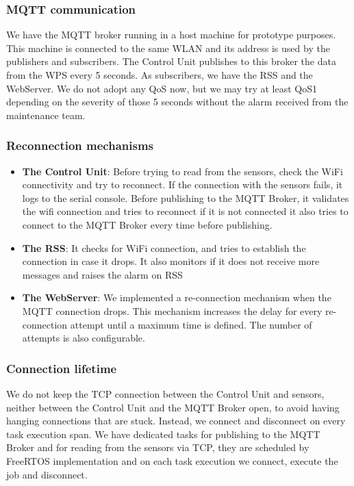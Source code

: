 \documentclass[11pt]{article}
\begin{document}
\subsubsection{MQTT communication}

We have the MQTT broker running in a host machine for prototype purposes. This machine is connected to the same WLAN and its address is used by the publishers and subscribers.
The Control Unit publishes to this broker the data from the WPS every 5 seconds.
As subscribers, we have the RSS and the WebServer. We do not adopt any QoS now, but we may try at least QoS1 depending on the severity of those 5 seconds without the alarm received from the maintenance team.

\subsubsection{Reconnection mechanisms}

\begin{itemize}
	\item  \textbf{The Control Unit}: Before trying to read from the sensors, check the WiFi connectivity and try to reconnect.
If the connection with the sensors fails, it logs to the serial console.
Before publishing to the MQTT Broker, it validates the wifi connection and tries to reconnect if it is not connected
it also tries to connect to the MQTT Broker every time before publishing.

	\item  \textbf{The RSS}: It checks for WiFi connection, and tries to establish the connection in case it drops.
It also monitors if it does not receive more messages and raises the alarm on RSS

	\item  \textbf{The WebServer}: We implemented a re-connection mechanism when the MQTT connection drops. This mechanism increases the delay for every re-connection attempt until a maximum time is defined. The number of attempts is also configurable.
\end{itemize}

\subsubsection{Connection lifetime}

We do not keep the TCP connection between the Control Unit and sensors, neither between the Control Unit and the MQTT Broker open, to avoid having hanging connections that are stuck. Instead, we connect and disconnect on every task execution span. 
We have dedicated tasks for publishing to the MQTT Broker and for reading from the sensors via TCP, they are scheduled by FreeRTOS implementation and on each task execution we connect, execute the job and disconnect.
\end{document}

